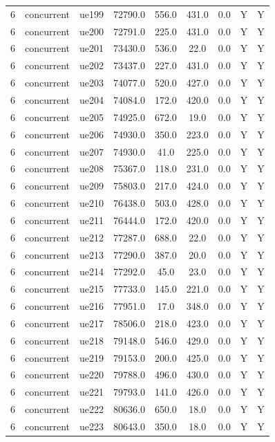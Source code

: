 \begin{table}[ht]
\begin{tabular}{|c|c|c|c|c|c|c|c|c|}
6 & concurrent & ue199 & 72790.0 & 556.0 & 431.0 & 0.0 & Y & Y \\
6 & concurrent & ue200 & 72791.0 & 225.0 & 431.0 & 0.0 & Y & Y \\
6 & concurrent & ue201 & 73430.0 & 536.0 & 22.0 & 0.0 & Y & Y \\
6 & concurrent & ue202 & 73437.0 & 227.0 & 431.0 & 0.0 & Y & Y \\
6 & concurrent & ue203 & 74077.0 & 520.0 & 427.0 & 0.0 & Y & Y \\
6 & concurrent & ue204 & 74084.0 & 172.0 & 420.0 & 0.0 & Y & Y \\
6 & concurrent & ue205 & 74925.0 & 672.0 & 19.0 & 0.0 & Y & Y \\
6 & concurrent & ue206 & 74930.0 & 350.0 & 223.0 & 0.0 & Y & Y \\
6 & concurrent & ue207 & 74930.0 & 41.0 & 225.0 & 0.0 & Y & Y \\
6 & concurrent & ue208 & 75367.0 & 118.0 & 231.0 & 0.0 & Y & Y \\
6 & concurrent & ue209 & 75803.0 & 217.0 & 424.0 & 0.0 & Y & Y \\
6 & concurrent & ue210 & 76438.0 & 503.0 & 428.0 & 0.0 & Y & Y \\
6 & concurrent & ue211 & 76444.0 & 172.0 & 420.0 & 0.0 & Y & Y \\
6 & concurrent & ue212 & 77287.0 & 688.0 & 22.0 & 0.0 & Y & Y \\
6 & concurrent & ue213 & 77290.0 & 387.0 & 20.0 & 0.0 & Y & Y \\
6 & concurrent & ue214 & 77292.0 & 45.0 & 23.0 & 0.0 & Y & Y \\
6 & concurrent & ue215 & 77733.0 & 145.0 & 221.0 & 0.0 & Y & Y \\
6 & concurrent & ue216 & 77951.0 & 17.0 & 348.0 & 0.0 & Y & Y \\
6 & concurrent & ue217 & 78506.0 & 218.0 & 423.0 & 0.0 & Y & Y \\
6 & concurrent & ue218 & 79148.0 & 546.0 & 429.0 & 0.0 & Y & Y \\
6 & concurrent & ue219 & 79153.0 & 200.0 & 425.0 & 0.0 & Y & Y \\
6 & concurrent & ue220 & 79788.0 & 496.0 & 430.0 & 0.0 & Y & Y \\
6 & concurrent & ue221 & 79793.0 & 141.0 & 426.0 & 0.0 & Y & Y \\
6 & concurrent & ue222 & 80636.0 & 650.0 & 18.0 & 0.0 & Y & Y \\
6 & concurrent & ue223 & 80643.0 & 350.0 & 18.0 & 0.0 & Y & Y \\

\end{tabular}
\end{table}
